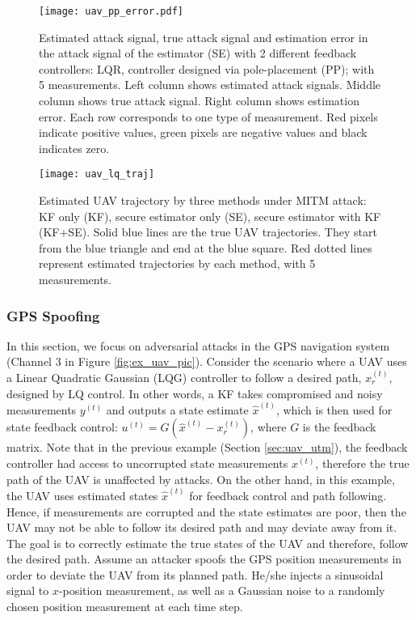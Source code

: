 \documentclass[journal]{IEEEtran}
\begin{document}
\begin{figure}
\center
\texttt{[image: uav\_pp\_error.pdf]}
\caption{Estimated attack signal, true attack signal and estimation error in the attack signal of the estimator (SE) with 2 different feedback controllers: LQR, controller designed via pole-placement (PP); with 5 measurements. Left column shows estimated attack signals. Middle column shows true attack signal. Right column shows estimation error. Each row corresponds to one type of measurement. Red pixels indicate positive values, green pixels are negative values and black indicates zero. }
\label{fig:ex_pp_err}
\end{figure}


\begin{figure}
\center
\texttt{[image: uav\_lq\_traj]}
\caption{Estimated UAV trajectory by three methods under MITM attack: KF only (KF), secure estimator only (SE), secure estimator with KF (KF+SE). Solid blue lines are the true UAV trajectories. They start from the blue triangle and end at the blue square. Red dotted lines represent estimated trajectories by each method, with 5 measurements.}
\label{fig:ex_uav_remote}
\end{figure}




\subsubsection{GPS Spoofing}

In this section, we focus on adversarial attacks in the GPS navigation system (Channel 3 in Figure \ref{fig:ex_uav_pic}). Consider the scenario where a UAV uses a Linear Quadratic Gaussian (LQG) controller to follow a desired path, $x_r^{(t)}$, designed by LQ control. In other words, a KF takes compromised and noisy measurements $y^{(t)}$ and outputs a state estimate $\hat x^{(t)}$, which is then used for state feedback control: $u^{(t)} = G (\hat x^{(t)} - x_r^{(t)})$, where $G$ is the feedback matrix. Note that in the previous example (Section \ref{sec:uav_utm}), the feedback controller had access to uncorrupted state measurements $x^{(t)}$, therefore the true path of the UAV is unaffected by attacks. On the other hand, in this example, the UAV uses estimated states $\hat x^{(t)}$ for feedback control and path following. Hence, if measurements are corrupted and the state estimates are poor, then the UAV may not be able to follow its desired path and may deviate away from it. The goal is to correctly estimate the true states of the UAV and therefore, follow the desired path. Assume an attacker spoofs the GPS position measurements in order to deviate the UAV from its planned path. He/she injects a sinusoidal signal to $x$-position measurement, as well as a Gaussian noise to a randomly chosen position measurement at each time step. 
\end{document}
